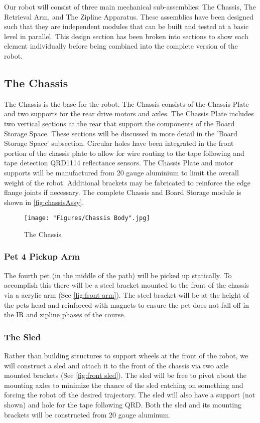 \documentclass[11pt, oneside]{article} %
\begin{document}
Our robot will consist of three main mechanical sub-assemblies: The Chassis, The Retrieval Arm, and The Zipline Apparatus. These assemblies have been designed such that they are independent modules that can be built and tested at a basic level in parallel. This design section has been broken into sections to show each element individually before being combined into the complete version of the robot.

	\subsection{The Chassis}

	The Chassis is the base for the robot. The Chassis consists of the Chassis Plate and two supports for the rear drive motors and axles. The Chassis Plate includes two vertical sections at the rear that support the components of the Board Storage Space. These sections will be discussed in more detail in the 'Board Storage Space' subsection. Circular holes have been integrated in the front portion of the chassis plate to allow for wire routing to the tape following and tape detection QRD1114 reflectance sensors. The Chassis Plate and motor supports will be manufactured from 20 gauge aluminium to limit the overall weight of the robot. Additional brackets may be fabricated to reinforce the edge flange joints if necessary. The complete Chassis and Board Storage module is shown in \autoref{fig:chassisAssy}.

	\begin{figure}[h]
		\centering
		\texttt{[image: "Figures/Chassis Body".jpg]}
		\caption[Chassis]{The Chassis}
		\label{fig:1}
	\end{figure}

		\subsubsection{Pet 4 Pickup Arm}
		The fourth pet (in the middle of the path) will be picked up statically. To accomplish this there will be a steel bracket mounted to the front of the chassis via a acrylic arm (See \autoref{fig:front arm}). The steel bracket will be at the height of the pets head and reinforced with magnets to ensure the pet does not fall off in the IR and zipline phases of the course.
	
		\subsubsection{The Sled}
		Rather than building structures to support wheels at the front of the robot, we will construct a sled and attach it to the front of the chassis via two axle mounted brackets (See \autoref{fig:front sled}). The sled will be free to pivot about the mounting axles to minimize the chance of the sled catching on something and forcing the robot off the desired trajectory. The sled will also have a support (not shown) and hole for the tape following QRD. Both the sled and its mounting brackets will be constructed from 20 gauge aluminum.
		
\end{document}
